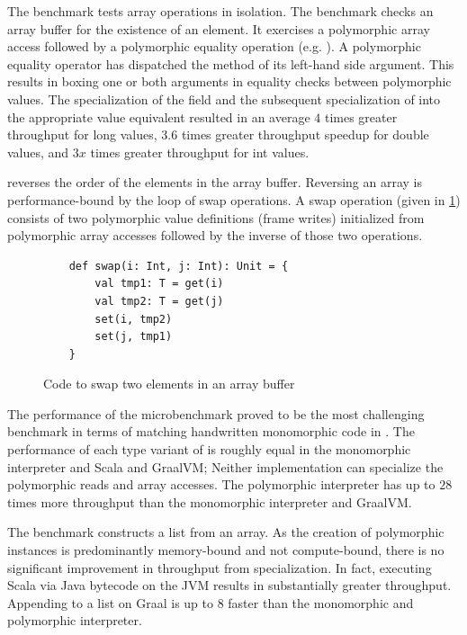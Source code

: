 The  benchmark tests array operations in isolation. 
The benchmark checks an array buffer for the existence of an element.
It exercises a polymorphic array access followed by a polymorphic equality operation (e.g. ).
A polymorphic equality operator has dispatched the  method of its left-hand side argument.
This results in boxing one or both arguments in equality checks between polymorphic values.
The specialization of the  field and the subsequent specialization of  into the appropriate value equivalent resulted in an average $4$ times greater throughput for long values, $3.6$ times greater throughput  speedup for double values, and $3x$ times greater throughput for int values.

 reverses the order of the elements in the array buffer.
Reversing an array is performance-bound by the loop of swap operations.
A swap operation (given in \ref{impl:swap}) consists of two polymorphic value definitions (frame writes) initialized from polymorphic array accesses followed by the inverse of those two operations.

\begin{figure}[!htb]
\begin{verbatim}
	def swap(i: Int, j: Int): Unit = {
		val tmp1: T = get(i)
		val tmp2: T = get(j)
		set(i, tmp2)
		set(j, tmp1)
	}
\end{verbatim}
\caption{Code to swap two elements in an array buffer}
\label{impl:swap}
\end{figure}

The performance of the  microbenchmark proved to be the most challenging benchmark in terms of matching handwritten monomorphic code in \cite{scala:miniboxing}.
The performance of each type variant of  is roughly equal in the monomorphic interpreter and Scala and GraalVM; 
Neither implementation can specialize the polymorphic reads and array accesses.
The polymorphic interpreter has up to $28$ times more throughput than the monomorphic interpreter and GraalVM.

The  benchmark constructs a list from an array.
As the creation of polymorphic instances is predominantly memory-bound and not compute-bound, there is no significant improvement in throughput from specialization.
In fact, executing Scala via Java bytecode on the JVM results in substantially greater throughput.
Appending to a list on Graal is up to $8$ faster than the monomorphic and polymorphic interpreter.

